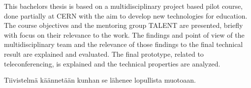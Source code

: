 \documentclass[english,12pt,a4paper,dvips]{article}
\begin{document}
%


\makecoverpage

\begin{abstractpage}[english]

 This bachelors thesis is based on a multidisciplinary project based pilot course, done partially at CERN with the aim to develop new technologies for education. The course objectives and the mentoring group TALENT are presented, briefly with focus on their relevance to the work. The findings and point of view of the multidisciplinary team and the relevance of those findings to the final technical result are explained and evaluated. The final prototype, related to teleconferencing, is explained and the technical properties are analyzed.
 
\end{abstractpage}

\begin{abstractpage}[finnish]
  
  Tiivistelmä käännetään kunhan se lähenee lopullista muotoaan.
  
  
\end{abstractpage}
\end{document}
